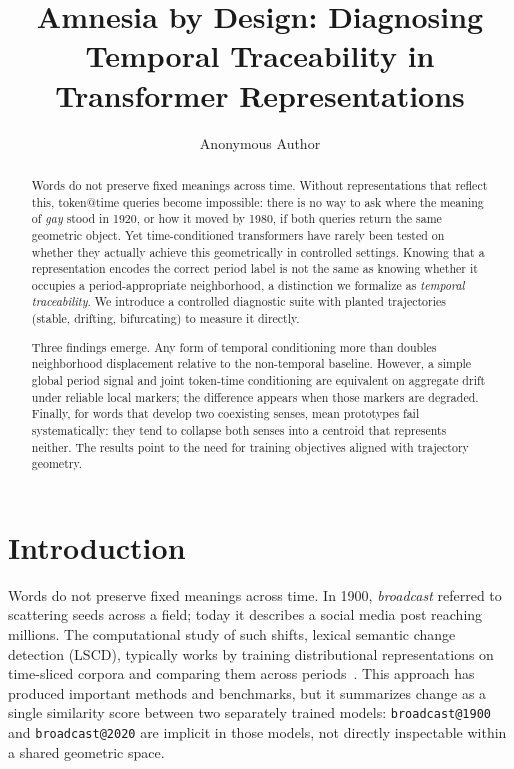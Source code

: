 \documentclass[runningheads]{llncs}
\begin{document}
\title{Amnesia by Design: Diagnosing Temporal Traceability in Transformer Representations}

\author{Anonymous Author}


\maketitle

\begin{abstract}
Words do not preserve fixed meanings across time. Without representations that 
reflect this, token@time queries become impossible: there is no way to ask where 
the meaning of \emph{gay} stood in 1920, or how it moved by 1980, if both 
queries return the same geometric object. Yet time-conditioned transformers have 
rarely been tested on whether they actually achieve this geometrically in controlled settings. Knowing 
that a representation encodes the correct period label is not the same as knowing 
whether it occupies a period-appropriate neighborhood, a distinction we formalize 
as \emph{temporal traceability}. We introduce a controlled diagnostic suite 
with planted trajectories (stable, drifting, bifurcating) to measure it directly.

Three findings emerge. Any form of temporal conditioning more than doubles 
neighborhood displacement relative to the non-temporal baseline. However, a 
simple global period signal and joint token-time conditioning are equivalent on 
aggregate drift under reliable local markers; the difference appears when those 
markers are degraded. Finally, for words that develop two coexisting senses, mean 
prototypes fail systematically: they tend to collapse both senses into a centroid that 
represents neither. The results point to the need for training objectives aligned 
with trajectory geometry.

\end{abstract}

\section{Introduction}

Words do not preserve fixed meanings across time. In 1900, \emph{broadcast} referred to scattering seeds across a field; today it describes a social media post reaching millions. The computational study of such shifts, lexical semantic change detection (LSCD), typically works by training distributional representations on time-sliced corpora and comparing them across periods~\cite{schlechtweg2020semeval,tahmasebi2021survey}. This approach has produced important methods and benchmarks, but it summarizes change as a single similarity score between two separately trained models: \texttt{broadcast@1900} and \texttt{broadcast@2020} are implicit in those models, not directly inspectable within a shared geometric space.
\end{document}
